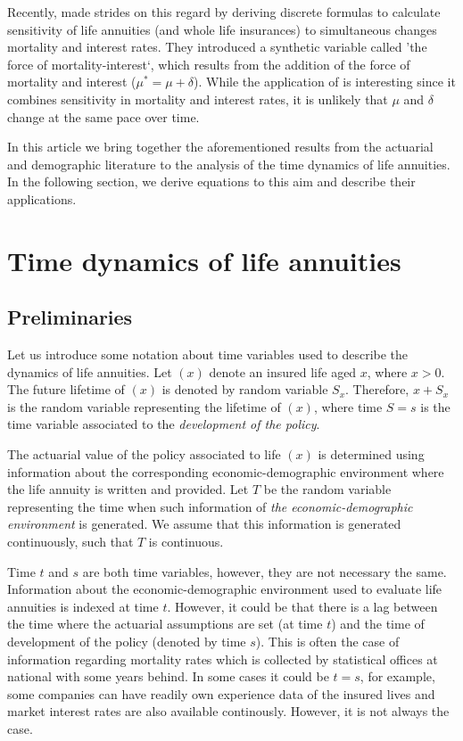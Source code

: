 \documentclass[12pt]{article}
\begin{document}
Recently, \citet{Lin2020} made strides on this regard by deriving discrete formulas to calculate sensitivity of life annuities (and whole life insurances) to simultaneous changes mortality and interest rates. They introduced a synthetic variable called 'the force of mortality-interest`, which results from the addition of the force of mortality and interest ($\mu^*=\mu+\delta$). While the application of \citet{Lin2020} is interesting since it combines sensitivity in mortality and interest rates, it is unlikely that $\mu$ and $\delta$ change at the same pace over time. 

In this article we bring together the aforementioned results from the actuarial and demographic literature to the analysis of the time dynamics of life annuities. In the following section, we derive equations to this aim and describe their applications.

\section{Time dynamics of life annuities}\label{sec:TimeDynamics}
\subsection{Preliminaries}\label{preliminaries}

Let us introduce some notation about time variables used to describe the dynamics of life annuities. Let $(x)$ denote an insured life aged $x$, where $x>0$. The future lifetime of $(x)$ is denoted by random variable $S_x$. Therefore, $x+S_x$ is the random variable representing the lifetime of $(x)$, where time $S=s$ is the time variable associated to the \textit{development of the policy}.

The actuarial value of the policy associated to life $(x)$ is determined using information about the corresponding economic-demographic environment where the life annuity is written and provided. Let $T$ be the random variable representing the time when such information of \textit{the economic-demographic environment} is generated. We assume that this information is generated continuously, such that $T$ is continuous.

Time $t$ and $s$ are both time variables, however, they are not necessary the same. Information about the economic-demographic environment used to evaluate life annuities is indexed at time $t$. However, it could be that there is a lag between the time where the actuarial assumptions are set (at time $t$) and the time of development of the policy (denoted by time $s$). This is often the case of information regarding mortality rates which is collected by statistical offices at national with some years behind. In some cases it could be $t=s$, for example, some companies can have readily own experience data of the insured lives and market interest rates are also available continously. However, it is not always the case.
\end{document}
